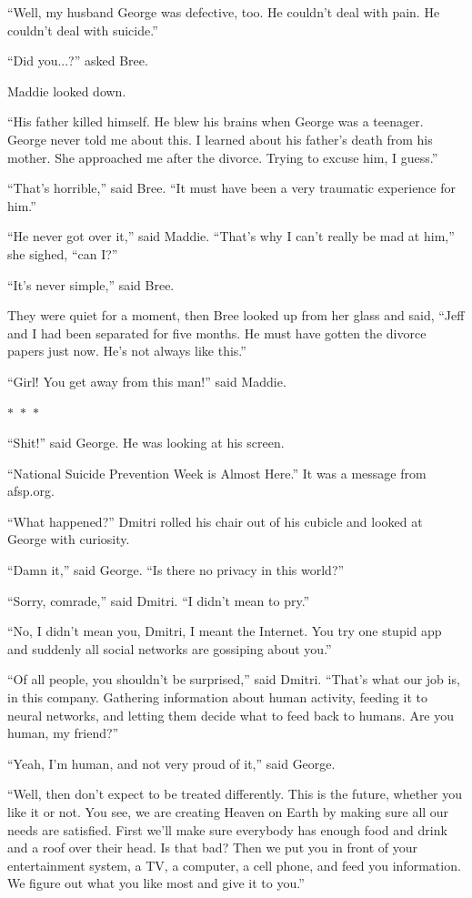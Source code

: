 \documentclass{memoir}
\newcommand{\starbreak}{%
\begin{center}
  $\ast$~$\ast$~$\ast$
\end{center}
}
\begin{document}
``Well, my husband George was defective, too. He couldn't deal with pain. He couldn't deal with suicide.''

``Did you...?'' asked Bree.

Maddie looked down. 

``His father killed himself. He blew his brains when George was a teenager. George never told me about this. I learned about his father's death from his mother. She approached me after the divorce. Trying to excuse him, I guess.''

``That's horrible,'' said Bree. ``It must have been a very traumatic experience for him.''

``He never got over it,'' said Maddie. ``That's why I can't really be mad at him,'' she sighed, ``can I?''

``It's never simple,'' said Bree. 

They were quiet for a moment, then Bree looked up from her glass and said, ``Jeff and I had been separated for five months. He must have gotten the divorce papers just now. He's not always like this.''

``Girl! You get away from this man!'' said Maddie.

\starbreak

``Shit!'' said George. He was looking at his screen.

``National Suicide Prevention Week is Almost Here.'' It was a message from afsp.org.

``What happened?'' Dmitri rolled his chair out of his cubicle and looked at George with curiosity.

``Damn it,'' said George. ``Is there no privacy in this world?''

``Sorry, comrade,'' said Dmitri. ``I didn't mean to pry.''

``No, I didn't mean you, Dmitri, I meant the Internet. You try one stupid app and suddenly all social networks are gossiping about you.''

``Of all people, you shouldn't be surprised,'' said Dmitri. ``That's what our job is, in this company. Gathering information about human activity, feeding it to neural networks, and letting them decide what to feed back to humans. Are you human, my friend?''

``Yeah, I'm human, and not very proud of it,'' said George.

``Well, then don't expect to be treated differently. This is the future, whether you like it or not. You see, we are creating Heaven on Earth by making sure all our needs are satisfied. First we'll make sure everybody has enough food and drink and a roof over their head. Is that bad? Then we put you in front of your entertainment system, a TV, a computer, a cell phone, and feed you information. We figure out what you like most and give it to you.''
\end{document}
